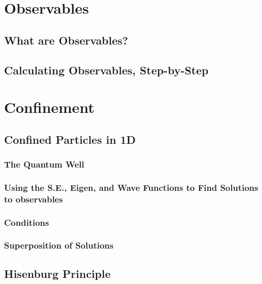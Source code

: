\documentclass[colorlinks,11pt,a4paper,normalphoto,withhyper,ragged2e]{altareport}
\begin{document}
	
	\pagebreak
	
	
	
	
\section{Observables}
	
	\subsection{What are Observables?}
	
	
	\subsection{Calculating Observables, Step-by-Step}
	
	
	\pagebreak
	
	
	
	
\section{Confinement}
	
	\subsection{Confined Particles in 1D}
		
		\subsubsection{The Quantum Well}
		
		
		\subsubsection{Using the S.E., Eigen, and Wave Functions to Find Solutions to observables}
		
		
		\subsubsection{Conditions}
		
		
		\subsubsection{Superposition of Solutions}
		
		
	\subsection{Hisenburg Principle}
	
\end{document}
